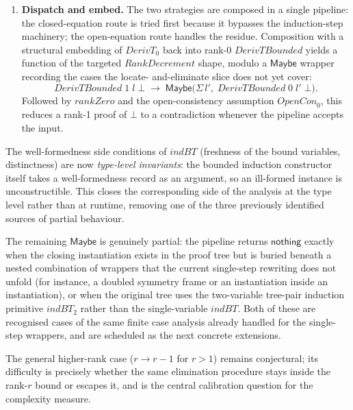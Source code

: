 \documentclass[11pt]{article}
\begin{document}
\begin{enumerate}
  \item \textbf{Dispatch and embed.}  The two strategies are
        composed in a single pipeline: the closed-equation route
        is tried first because it bypasses the induction-step
        machinery; the open-equation route handles the residue.
        Composition with a structural embedding of $\mathit{DerivT}_0$
        back into rank-0 $\mathit{DerivTBounded}$ yields a function
        of the targeted $\mathit{RankDecrement}$ shape, modulo a
        $\mathsf{Maybe}$ wrapper recording the cases the locate-
        and-eliminate slice does not yet cover:
        \[
          \mathit{DerivTBounded}\;1\;l\;\bot \;\longrightarrow\;
          \mathsf{Maybe}\bigl(\Sigma\,l',\;
            \mathit{DerivTBounded}\;0\;l'\;\bot\bigr).
        \]
        Followed by $\mathit{rankZero}$ and the open-consistency
        assumption $\mathit{OpenCon}_0$, this reduces a rank-1 proof
        of $\bot$ to a contradiction whenever the pipeline accepts
        the input.
\end{enumerate}

The well-formedness side conditions of $\mathit{indBT}$ (freshness
of the bound variables, distinctness) are now \emph{type-level
invariants}: the bounded induction constructor itself takes a
well-formedness record as an argument, so an ill-formed instance
is unconstructible.  This closes the corresponding side of the
analysis at the type level rather than at runtime, removing one of
the three previously identified sources of partial behaviour.

The remaining $\mathsf{Maybe}$ is genuinely partial: the pipeline
returns $\mathsf{nothing}$ exactly when the closing instantiation
exists in the proof tree but is buried beneath a nested combination
of wrappers that the current single-step rewriting does not unfold
(for instance, a doubled symmetry frame or an instantiation inside
an instantiation), or when the original tree uses the
two-variable tree-pair induction primitive $\mathit{indBT}_2$
rather than the single-variable $\mathit{indBT}$.  Both of these
are recognised cases of the same finite case analysis already
handled for the single-step wrappers, and are scheduled as the next
concrete extensions.

The general higher-rank case ($r \to r{-}1$ for $r > 1$) remains
conjectural; its difficulty is precisely whether the same
elimination procedure stays inside the rank-$r$ bound or escapes
it, and is the central calibration question for the complexity
measure.
\end{document}
